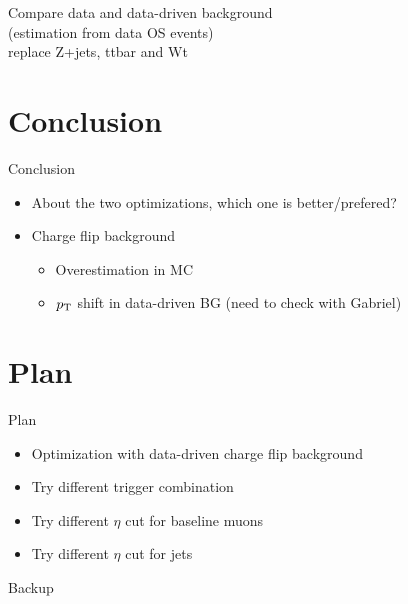 \documentclass[mathserif,serif]{beamer}
\begin{document}



\begin{frame}
\begin{center}
\huge
Compare data and data-driven background \\
\normalsize
(estimation from data OS events) \\
replace Z+jets, ttbar and Wt
\end{center}
\end{frame}




\section{Conclusion}
\begin{frame}{Conclusion}
\begin{itemize}
\item About the two optimizations, which one is better/prefered?
\item Charge flip background
\begin{itemize}
\item Overestimation in MC
\item $p_{\text{T}}$ shift in data-driven BG (need to check with Gabriel)
\end{itemize}
\end{itemize}
\end{frame}

\section{Plan}
\begin{frame}{Plan}
\begin{itemize}
\item Optimization with data-driven charge flip background
\item Try different trigger combination
\item Try different $\eta$ cut for baseline muons
\item Try different $\eta$ cut for jets
\end{itemize}
\end{frame}

\begin{frame}
\begin{center}
\huge
Backup
\end{center}
\end{frame}
\end{document}
